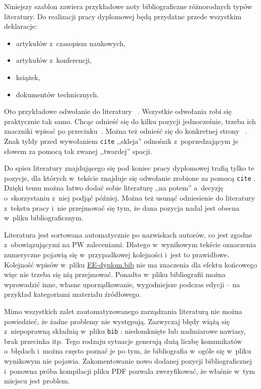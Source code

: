 Niniejszy szablon zawiera przykładowe noty bibliograficzne różnorodnych typów literatury. Do realizacji pracy dyplomowej
będą przydatne przede wszystkim deklaracje:
\begin{itemize}
    \item artykułów z~czasopism naukowych,
    \item artykułów z~konferencji,
    \item książek,
    \item dokumentów technicznych.
\end{itemize}

Oto przykładowe odwołanie do literatury~\cite{fowler2009}
. Wszystkie odwołania robi się praktycznie tak samo. Chcąc odnieść się do kilku pozycji jednocześnie, trzeba ich
znaczniki wpisać po przecinku~\cite{maxwell1865,leksinski1995}. Można też odnieść się do konkretnej strony~
\cite[s.~38]{leksinski1995}. Znak tyldy przed wywołaniem \texttt{cite}
,,skleja'' odnośnik z~poprzedzającym je słowem za pomocą tak zwanej ,,twardej'' spacji.

Do spisu literatury znajdującego się pod koniec pracy dyplomowej trafią tylko te pozycje, dla których w~tekście znajduje
się odwołanie zrobione za pomocą \texttt{cite}
. Dzięki temu można łatwo dodać sobie literaturę ,,na potem'' a~decyzję o~skorzystaniu z~niej podjąć później. Można też
usunąć odniesienie do literatury z~tekstu pracy i~nie przejmować się tym, że dana pozycja nadal jest obecna w~pliku
bibliograficznym.

Literatura jest sortowana automatycznie po nazwiskach autorów, co jest zgodne z~obowiązującymi na PW zaleceniami.
Dlatego w~wynikowym tekście oznaczenia numeryczne pojawią się w~przypadkowej kolejności i~jest to prawidłowe. Kolejność
wpisów w~pliku \href{./EE-dyplom.bib}{EE-dyplom.bib}
nie ma znaczenia dla efektu końcowego więc nie trzeba się nią przejmować. Ponadto w~pliku bibliografii można wprowadzić
inne, własne uporządkowanie, wygodniejsze podczas edycji -- na przykład kategoriami materiału źródłowego.

Mimo wszystkich zalet zautomatyzowanego zarządzania literaturą nie można powiedzieć, że żadne problemy nie występują.
Zazwyczaj błędy wiążą się z~niepoprawną składnią w~pliku \texttt{bib}
: niedomknięte lub nadmiarowe nawiasy, brak przecinka itp. Tego rodzaju sytuacje generują dużą liczbę komunikatów
o~błędach i~można często poznać je po tym, że bibliografia w~ogóle się w~pliku wynikowym nie pojawia. Zakomentowanie
nowo dodanej pozycji bibliograficznej i~ponowna próba kompilacji pliku PDF pozwala zweryfikować, że właśnie w~tym
miejscu jest problem.

